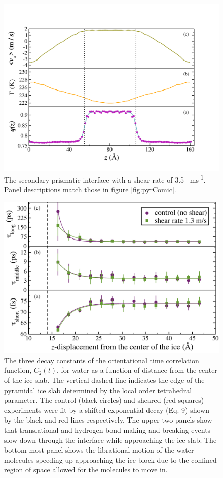 \documentclass{pnastwo}
\begin{document}
\begin{figure}
\includegraphics[width=\linewidth]{SP_comic_strip}
\caption{\label{fig:spComic} The secondary prismatic interface with a shear 
rate of 3.5 \
ms\textsuperscript{-1}. Panel descriptions match those in figure \ref{fig:pyrComic}.}
\end{figure}

\begin{figure}
\includegraphics[width=\linewidth]{Pyr-orient}
\caption{\label{fig:PyrOrient} The three decay constants of the 
orientational time correlation function, $C_2(t)$, for water as a function
of distance from the center of the ice slab. The vertical dashed line
indicates the edge of the pyramidal ice slab determined by the local order
tetrahedral parameter. The control (black circles) and sheared (red squares) 
experiments were fit by a shifted exponential decay (Eq. 9\cite{Louden13})
shown by the black and red lines respectively. The upper two panels show that 
translational and hydrogen bond making and breaking events slow down 
through the interface while approaching the ice slab. The bottom most panel
shows the librational motion of the water molecules speeding up approaching
the ice block due to the confined region of space allowed for the molecules
 to move in.}
\end{figure}  
\end{document}
